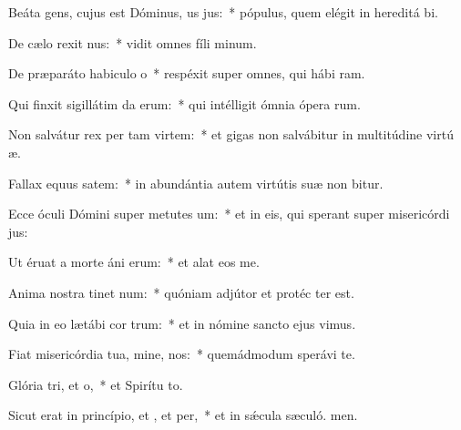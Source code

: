 \item Beáta gens, cujus est Dóminus, us jus:~* pópulus, quem elégit in hereditá bi.
\item De cælo rexit nus:~* vidit omnes fíli minum.
\item De præparáto habiculo o~* respéxit super omnes, qui hábi ram.
\item Qui finxit sigillátim da erum:~* qui intélligit ómnia ópera rum.
\item Non salvátur rex per tam virtem:~* et gigas non salvábitur in multitúdine virtú æ.
\item Fallax equus  satem:~* in abundántia autem virtútis suæ non bitur.
\item Ecce óculi Dómini super metutes um:~* et in eis, qui sperant super misericórdi jus:
\item Ut éruat a morte áni erum:~* et alat eos  me.
\item Anima nostra tinet num:~* quóniam adjútor et protéc ter est.
\item Quia in eo lætábi cor trum:~* et in nómine sancto ejus vimus.
\item Fiat misericórdia tua, mine,  nos:~* quemádmodum sperávi  te.
\item Glória tri, et o,~* et Spirítu to.
\item Sicut erat in princípio, et , et per,~* et in sǽcula sæculó. men.
